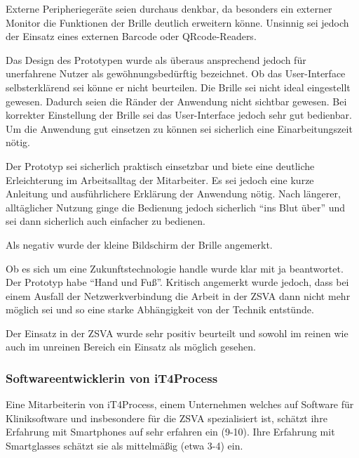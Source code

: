 Externe Peripheriegeräte seien durchaus denkbar, da besonders ein externer Monitor die Funktionen der Brille deutlich erweitern könne. Unsinnig sei jedoch der Einsatz eines externen Barcode oder QRcode-Readers.

Das Design des Prototypen wurde als überaus ansprechend jedoch für unerfahrene Nutzer als gewöhnungsbedürftig bezeichnet. Ob das User-Interface selbsterklärend sei könne er nicht beurteilen. Die Brille sei nicht ideal eingestellt gewesen. Dadurch seien die Ränder der Anwendung nicht sichtbar gewesen. Bei korrekter Einstellung der Brille sei das User-Interface jedoch sehr gut bedienbar. Um die Anwendung gut einsetzen zu können sei sicherlich eine Einarbeitungszeit nötig. 

Der Prototyp sei sicherlich praktisch einsetzbar und biete eine deutliche Erleichterung im Arbeitsalltag der Mitarbeiter. Es sei jedoch eine kurze Anleitung und ausführlichere Erklärung der Anwendung nötig. Nach längerer, alltäglicher Nutzung ginge die Bedienung jedoch sicherlich \enquote{ins Blut über} und sei dann sicherlich auch einfacher zu bedienen. 

Als negativ wurde der kleine Bildschirm der Brille angemerkt. 

Ob es sich um eine Zukunftstechnologie handle wurde klar mit ja beantwortet. Der Prototyp habe \enquote{Hand und Fuß}. Kritisch angemerkt wurde jedoch, dass bei einem Ausfall der Netzwerkverbindung die Arbeit in der ZSVA dann nicht mehr möglich sei und so eine starke Abhängigkeit von der Technik entstünde.

Der Einsatz in der ZSVA wurde sehr positiv beurteilt und sowohl im reinen wie auch im unreinen Bereich ein Einsatz als möglich gesehen.
%
%
\subsubsection{Softwareentwicklerin von iT4Process}
%
Eine Mitarbeiterin von iT4Process, einem Unternehmen welches auf Software für Kliniksoftware und insbesondere für die ZSVA spezialisiert ist, schätzt ihre Erfahrung mit Smartphones auf sehr erfahren ein (9-10). Ihre Erfahrung mit Smartglasses schätzt sie als mittelmäßig (etwa 3-4) ein. 


